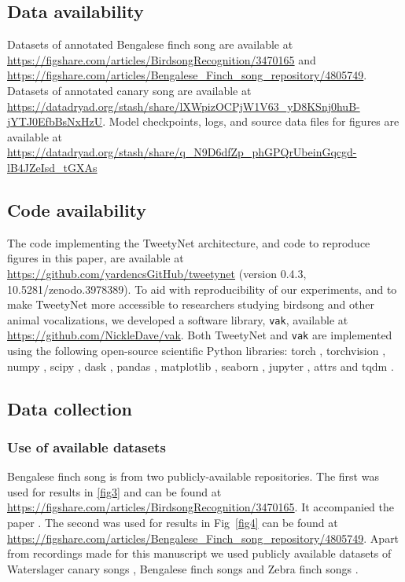 \documentclass[10pt,letterpaper]{article}
\begin{document}
\subsection*{Data availability}
Datasets of annotated Bengalese finch song are available at 
\url{https://figshare.com/articles/BirdsongRecognition/3470165} and  \url{https://figshare.com/articles/Bengalese_Finch_song_repository/4805749}.
Datasets of annotated canary song are available at \url{ https://datadryad.org/stash/share/lXWpizOCPjW1V63_yD8KSnj0huB-jYTJ0EfbBsNxHzU}.
Model checkpoints, logs, and source data files for figures are available at \url{https://datadryad.org/stash/share/q_N9D6dfZp_phGPQrUbeinGqcgd-lB4JZeIsd_tGXAs}

\subsection*{Code availability}
\label{methods:code}
The code implementing the TweetyNet architecture,
and code to reproduce figures in this paper, are available at
\url{https://github.com/yardencsGitHub/tweetynet}
(version 0.4.3, 10.5281/zenodo.3978389).
To aid with reproducibility of our experiments,
and to make TweetyNet more accessible to researchers studying birdsong
and other animal vocalizations, we developed a software library, 
\texttt{vak}, available at \url{https://github.com/NickleDave/vak}.
Both TweetyNet and \texttt{vak} are implemented using 
the following open-source scientific Python libraries: 
torch \cite{paszke_automatic_2017}, 
torchvision \cite{marcel_torchvision_2010}, 
numpy \cite{walt_numpy_2011, harris2020array}, 
scipy \cite{virtanen_scipy_2020}, 
dask \cite{dask_development_team_dask_2016}, 
pandas \cite{team_pandas-devpandas_2020}, 
matplotlib \cite{Hunter:2007,thomas_a_caswell_2020_4030140}, 
seaborn \cite{michael_waskom_2020_4019146}, 
jupyter \cite{kluyver2016jupyter},
attrs \cite{attrs}
and tqdm \cite{casper_da_costa_luis_2020_4054194}.

\subsection*{Data collection}
\subsubsection*{Use of available datasets}
Bengalese finch song is from two publicly-available repositories. 
The first \cite{koumura_birdsongrecognition_2016} was used for results in \ref{fig3} and can be found at 
\url{https://figshare.com/articles/BirdsongRecognition/3470165}. It accompanied the paper \cite{koumura_automatic_2016-1}.
The second \cite{nicholson_bengalese_2017} was used for results in Fig~\ref{fig4} can be found at \url{https://figshare.com/articles/Bengalese_Finch_song_repository/4805749}.
Apart from recordings made for this manuscript we used publicly available datasets of Waterslager canary songs \cite{markowitz_long-range_2013}, Bengalese finch songs \cite{koumura_automatic_2016-1} and Zebra finch songs \cite{otchy_acute_2015}.
\end{document}
